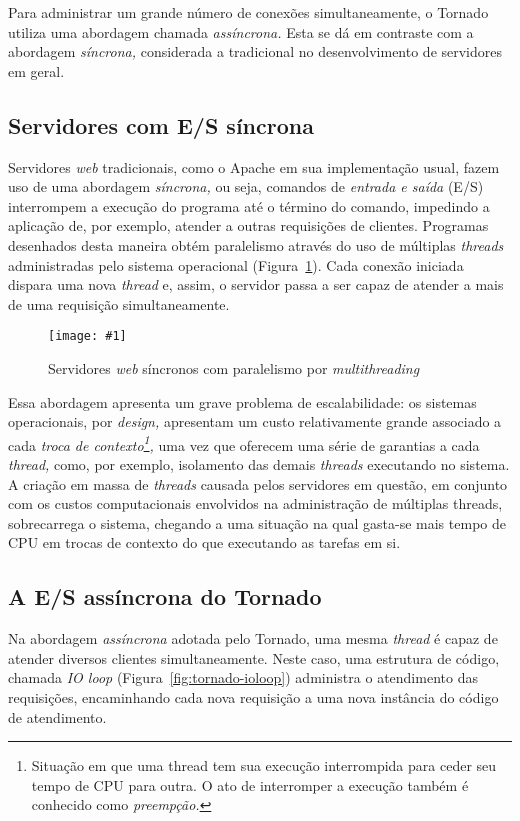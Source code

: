 \documentclass[ruledheader, 12pt]{abnt}
\newcommand{\figcustom}[4]{\par
	\begin{figure}[#3]
		\centering
		\texttt{[image: \#1]}
		\caption{\label{fig:#1}#2}
	\end{figure}
\par}
\newcommand{\figref}[1]{(Figura~\ref{fig:#1})}
\begin{document}

Para administrar um grande número de conexões simultaneamente, o Tornado utiliza uma abordagem chamada \emph{assíncrona.} Esta se dá em contraste com a abordagem \emph{síncrona,} considerada a tradicional no desenvolvimento de servidores em geral.

\subsection{Servidores com E/S síncrona}

Servidores \emph{web} tradicionais, como o Apache em sua implementação usual, fazem uso de uma abordagem \emph{síncrona,} ou seja, comandos de \emph{entrada e saída} (E/S) interrompem a execução do programa até o término do comando, impedindo a aplicação de, por exemplo, atender a outras requisições de clientes. Programas desenhados desta maneira obtém paralelismo através do uso de múltiplas \emph{threads} administradas pelo sistema operacional \figref{multithreaded-webservers}. Cada conexão iniciada dispara uma nova \emph{thread} e, assim, o servidor passa a ser capaz de atender a mais de uma requisição simultaneamente.

\figcustom{multithreaded-webservers}{Servidores \emph{web} síncronos com paralelismo por \emph{multithreading}}{bp}{.9}

Essa abordagem apresenta um grave problema de escalabilidade: os sistemas operacionais, por \emph{design,} apresentam um custo relativamente grande associado a cada \emph{troca de contexto\footnote{Situação em que uma thread tem sua execução interrompida para ceder seu tempo de CPU para outra. O ato de interromper a execução também é conhecido como \emph{preempção.}},} uma vez que oferecem uma série de garantias a cada \emph{thread,} como, por exemplo, isolamento das demais \emph{threads} executando no sistema. A criação em massa de \emph{threads} causada pelos servidores em questão, em conjunto com os custos computacionais envolvidos na administração de múltiplas threads, sobrecarrega o sistema, chegando a uma situação na qual gasta-se mais tempo de CPU em trocas de contexto do que executando as tarefas em si.

\subsection{A E/S assíncrona do Tornado}

Na abordagem \emph{assíncrona} adotada pelo Tornado, uma mesma \emph{thread} é capaz de atender diversos clientes simultaneamente. Neste caso, uma estrutura de código, chamada \emph{IO loop} \figref{tornado-ioloop} administra o atendimento das requisições, encaminhando cada nova requisição a uma nova instância do código de atendimento.
\end{document}

